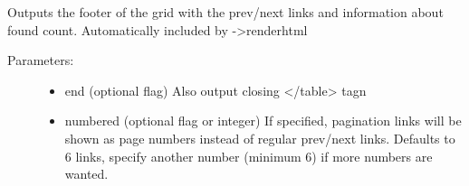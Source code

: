 \documentclass[letterpaper,10pt,english]{sphinxmanual}
\begin{document}
\begin{fulllineitems}
\begin{fulllineitems}
\end{fulllineitems}


\begin{fulllineitems}
\label{knop_grid:knop_grid.rawheader}
\end{fulllineitems}



\begin{fulllineitems}
\end{fulllineitems}


\begin{fulllineitems}
\label{knop_grid:knop_grid.renderfooter}
\end{fulllineitems}


\begin{fulllineitems}
Outputs the footer of the grid with the prev/next links and information about
found count. Automatically included by -\textgreater{}renderhtml
\begin{description}
\item[{Parameters:}] \leavevmode\begin{itemize}
\item {} 
end (optional flag)
Also output closing \textless{}/table\textgreater{} tagn

\item {} 
numbered (optional flag or integer)
If specified, pagination links will be shown as page numbers instead of
regular prev/next links. Defaults to 6 links, specify another number
(minimum 6) if more numbers are wanted.

\end{itemize}

\end{description}

\end{fulllineitems}


\end{fulllineitems}
\end{document}
